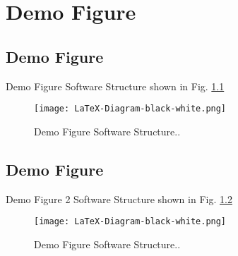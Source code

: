 \chapter{Demo Figure}
\section{Demo Figure}
Demo Figure \latex Software Structure shown in Fig. \ref{fig:fig1}

\begin{figure}[h]
  \centering
  \texttt{[image: LaTeX-Diagram-black-white.png]}
  \caption{Demo Figure \latex Software Structure..}
  \label{fig:fig1}
\end{figure}

\section{Demo Figure}
Demo Figure 2 \latex Software Structure shown in Fig. \ref{fig:fig2}

\begin{figure}[h]
  \centering
  \texttt{[image: LaTeX-Diagram-black-white.png]}
  \caption{Demo Figure \latex Software Structure..}
  \label{fig:fig2}
\end{figure}